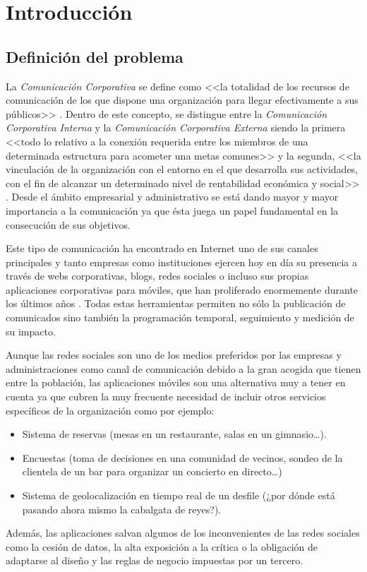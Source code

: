 \chapter{Introducción}
\section{Definición del problema}
La \emph{Comunicación Corporativa} se define como <<la totalidad de los recursos de comunicación de los que dispone una organización para llegar efectivamente a sus públicos>> \cite{riel_2001}. Dentro de este concepto, se distingue entre la \emph{Comunicación Corporativa Interna} y la \emph{Comunicación Corporativa Externa} siendo la primera <<todo lo relativo a la conexión requerida entre los miembros de una determinada estructura para acometer una metas comunes>> y la segunda, <<la vinculación de la organización con el entorno en el que desarrolla sus actividades, con el fin de alcanzar un determinado nivel de rentabilidad económica y social>> \cite{castro_2007}. Desde el ámbito empresarial y administrativo se está dando mayor y mayor importancia a la comunicación ya que ésta juega un papel fundamental en la consecución de sus objetivos.

Este tipo de comunicación ha encontrado en Internet uno de sus canales principales y tanto empresas como instituciones ejercen hoy en día su presencia a través de webs corporativas, blogs, redes sociales o incluso sus propias aplicaciones corporativas para móviles, que han proliferado enormemente durante los últimos años \cite{playstore} \cite{appstore}. Todas estas herramientas permiten no sólo la publicación de comunicados sino también la programación temporal, seguimiento y medición de su impacto.

Aunque las redes sociales son uno de los medios preferidos por las empresas \cite{linkedin} y administraciones \cite{grande2015casos} como canal de comunicación debido a la gran acogida que tienen entre la población, las aplicaciones móviles son una alternativa muy a tener en cuenta ya que cubren la muy frecuente necesidad de incluir otros servicios específicos de la organización como por ejemplo:
\begin{itemize}
    \item Sistema de reservas (mesas en un restaurante, salas en un gimnasio\dots).
    \item Encuestas (toma de decisiones en una comunidad de vecinos, sondeo de la clientela de un bar para organizar un concierto en directo\dots)
    \item Sistema de geolocalización en tiempo real de un desfile (¿por dónde está pasando ahora mismo la cabalgata de reyes?).
\end{itemize}
Además, las aplicaciones salvan algunos de los inconvenientes de las redes sociales como la cesión de datos, la alta exposición a la crítica o la obligación de adaptarse al diseño y las reglas de negocio impuestas por un tercero.

